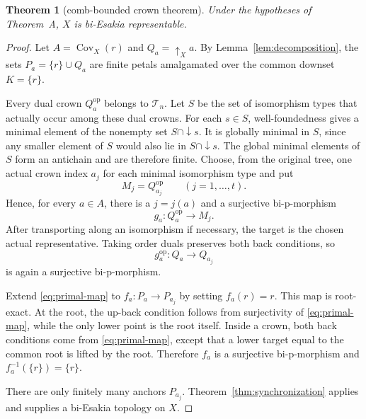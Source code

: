 \documentclass[11pt]{article}
\newtheorem{theorem}{Theorem}[section]
\theoremstyle{remark}
\numberwithin{equation}{section}
\begin{document}
\begin{theorem}[comb-bounded crown theorem]\label{thm:crowns}
Under the hypotheses of Theorem~A, $X$ is bi-Esakia representable.
\end{theorem}

\begin{proof}
Let $A=\operatorname{Cov}_X(r)$ and $Q_a=\uparrow_Xa$. By
Lemma~\ref{lem:decomposition}, the sets $P_a=\{r\}\cup Q_a$ are finite petals
amalgamated over the common downset $K=\{r\}$.

Every dual crown $Q_a^{\mathrm{op}}$ belongs to $\mathcal T_n$. Let $S$ be the
set of isomorphism types that actually occur among these dual crowns. For each
$s\in S$, well-foundedness gives a minimal element of the nonempty set
$S\cap\downarrow s$. It is globally minimal in $S$, since any smaller element
of $S$ would also lie in $S\cap\downarrow s$. The global minimal elements of
$S$ form an antichain and are therefore finite. Choose, from the original tree,
one actual crown index $a_j$ for each minimal isomorphism type and put
\begin{equation}
M_j=Q_{a_j}^{\mathrm{op}}
\qquad(j=1,\ldots,t).
\label{eq:anchors}
\end{equation}
Hence, for every $a\in A$, there is a $j=j(a)$ and a surjective bi-p-morphism
\begin{equation}
g_a:Q_a^{\mathrm{op}}\longrightarrow M_j.
\label{eq:dual-map}
\end{equation}
After transporting along an isomorphism if necessary, the target is the chosen
actual representative. Taking order duals preserves both back conditions, so
\begin{equation}
g_a^{\mathrm{op}}:Q_a\longrightarrow Q_{a_j}
\label{eq:primal-map}
\end{equation}
is again a surjective bi-p-morphism.

Extend \eqref{eq:primal-map} to $f_a:P_a\to P_{a_j}$ by setting $f_a(r)=r$.
This map is root-exact. At the root, the up-back condition follows from
surjectivity of \eqref{eq:primal-map}, while the only lower point is the root
itself. Inside a crown, both back conditions come from
\eqref{eq:primal-map}, except that a lower target equal to the common root is
lifted by the root. Therefore $f_a$ is a surjective bi-p-morphism and
$f_a^{-1}(\{r\})=\{r\}$.

There are only finitely many anchors $P_{a_j}$.
Theorem~\ref{thm:synchronization} applies and supplies a bi-Esakia topology on
$X$.
\end{proof}
\end{document}
